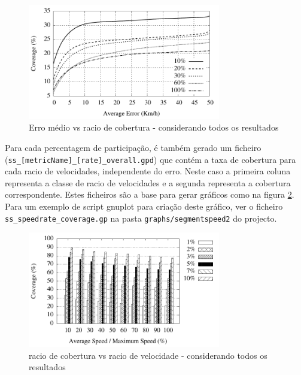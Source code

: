 \documentclass{article}
\newcommand{\tm}[1]{\texttt{#1}}
\begin{document}
\begin{figure}[h!]
	\centering
	\includegraphics[width=0.75\textwidth]{figs/ss_speedrate_coverage.pdf}
	\caption{Erro médio vs racio de cobertura - considerando todos os resultados}
	\label{fig:error_coverage_all}
\end{figure}

Para cada percentagem de participação, é também gerado um ficheiro (\tm{ss\_[metricName]\_[rate]\_overall.gpd}) que contém a taxa de cobertura para cada racio de velocidades, independente do erro. Neste caso a primeira coluna representa a classe de racio de velocidades e a segunda representa a cobertura correspondente. Estes ficheiros são a base para gerar gráficos como na figura \ref{fig:coverage_all}.  Para um exemplo de script gnuplot para criação deste gráfico, ver o ficheiro \tm{ss\_speedrate\_coverage.gp} na pasta \tm{graphs/segmentspeed2} do projecto.

\begin{figure}[h!]
	\vspace{-2mm}
	\centering
	\includegraphics[width=0.75\textwidth]{figs/ss_coverage_all.pdf}
	\caption{racio de cobertura vs racio de velocidade - considerando todos os resultados}
	\label{fig:coverage_all}
\end{figure}
\end{document}
